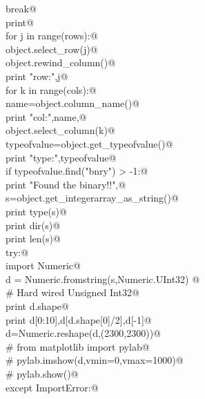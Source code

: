 \documentclass[10pt,a4paper,twoside,notitlepage]{article}
\begin{document}
\begin{flushleft}
\begin{list}{}{}
\mbox{}\verb@           break@\\
\mbox{}\verb@    print@\\
\mbox{}\verb@    for j in range(rows):@\\
\mbox{}\verb@        object.select_row(j)@\\
\mbox{}\verb@        object.rewind_column()@\\
\mbox{}\verb@        print "row:",j@\\
\mbox{}\verb@        for k in range(cols):@\\
\mbox{}\verb@            name=object.column_name()@\\
\mbox{}\verb@            print "col:",name,@\\
\mbox{}\verb@            object.select_column(k)@\\
\mbox{}\verb@            typeofvalue=object.get_typeofvalue()@\\
\mbox{}\verb@            print "type:",typeofvalue@\\
\mbox{}\verb@            if typeofvalue.find("bnry") > -1:@\\
\mbox{}\verb@                print "Found the binary!!",@\\
\mbox{}\verb@                s=object.get_integerarray_as_string()@\\
\mbox{}\verb@                print type(s)@\\
\mbox{}\verb@                print dir(s)@\\
\mbox{}\verb@                print len(s)@\\
\mbox{}\verb@                try:@\\
\mbox{}\verb@                   import Numeric@\\
\mbox{}\verb@                   d = Numeric.fromstring(s,Numeric.UInt32) @\\
\mbox{}\verb@                   # Hard wired Unsigned Int32@\\
\mbox{}\verb@                   print d.shape@\\
\mbox{}\verb@                   print d[0:10],d[d.shape[0]/2],d[-1]@\\
\mbox{}\verb@                   d=Numeric.reshape(d,(2300,2300))@\\
\mbox{}\verb@#                   from matplotlib import pylab@\\
\mbox{}\verb@#                   pylab.imshow(d,vmin=0,vmax=1000)@\\
\mbox{}\verb@#                   pylab.show()@\\
\mbox{}\verb@                except ImportError:@\\

\end{list}
\end{flushleft}
\end{document}
